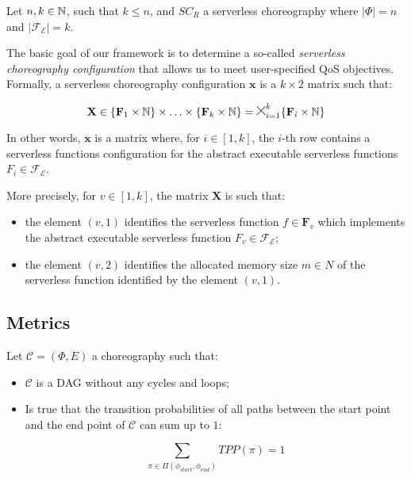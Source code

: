 Let $n,k \in \mathbb{N}$, such that $k \leq n$, and $SC_R$ a serverless choreography where $|\Phi| = n$ and $|\mathscr{F_E}| = k$. 

The basic goal of our framework is to determine a so-called \textit{serverless choreography configuration} that allows us to meet user-specified QoS objectives. Formally, a serverless choreography configuration $\textbf{x}$ is a $k\times2$ matrix such that:

\begin{equation}
\textbf{X} \in \lbrace \textbf{F}_1 \times \mathbb{N} \rbrace \times \ldots \times \lbrace \textbf{F}_k \times \mathbb{N} \rbrace = \Cross_{i = 1}^k \lbrace \textbf{F}_i \times \mathbb{N} \rbrace
\end{equation}

In other words, $\textbf{x}$ is a matrix where, for $i \in \left[ 1, k \right]$, the $i$-th row contains a serverless functions configuration for the abstract executable serverless functions $F_i \in \mathscr{F_E}$. 

More precisely, for $v \in \left[ 1, k \right]$, the matrix $\textbf{X}$ is such that:

\begin{itemize}
	\item the element $(v,1)$ identifies the serverless function $f \in \textbf{F}_v$ which implements the abstract executable serverless function $F_v \in \mathscr{F_E}$;
	
	\item the element $(v,2)$ identifies the allocated memory size $m \in N$ of the serverless function identified by the element $(v,1)$.
\end{itemize}

\subsection{Metrics}

Let $\mathcal{C} = (\Phi,E)$ a choreography such that:
\begin{itemize}
	\item $\mathcal{C}$ is a DAG without any cycles and loops;
	\item Is true that the transition probabilities of all paths between the start point and
	the end point of $\mathcal{C}$ can sum up to $1$:
	
	\begin{equation}
		\sum_{\pi \in \Pi(\phi_{start}, \phi_{end})} TPP(\pi) = 1
	\end{equation}

\end{itemize}

